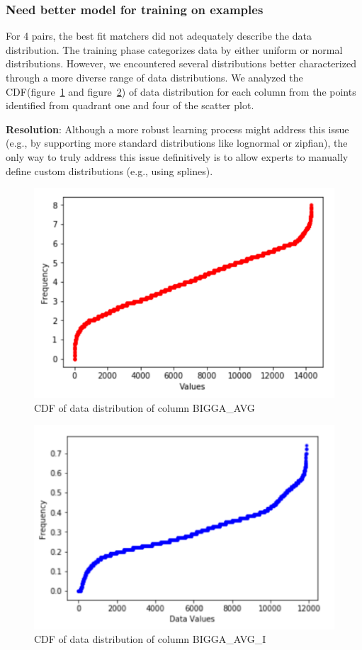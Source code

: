 \subsubsection{Need better model for training on examples}
For 4 pairs, the best fit matchers did not adequately describe the data distribution.
The training phase categorizes data by either uniform or normal distributions. 
However, we encountered several distributions better characterized through a more diverse range of data distributions.
We analyzed the CDF(figure~\ref{fig:Distribution 1} and figure~\ref{fig:Distribution 2}) of data distribution for each column from the points identified from quadrant one and four of the scatter plot. 

\textbf{Resolution}: Although a more robust learning process might address this issue (e.g., by supporting more standard distributions like lognormal or zipfian), the only way to truly address this issue definitively is to allow experts to manually define custom distributions (e.g., using splines).

\begin{figure}[H]
	\centering
	\includegraphics[width=0.8\columnwidth]{graphics/Challenge1_1}
	\caption{CDF of data distribution of column BIGGA\_AVG}
	\label{fig:Distribution 1}
\end{figure}

\begin{figure}[H]
	\centering
	\includegraphics[width=0.8\columnwidth]{graphics/Challenge1_2}
	\caption{CDF of data distribution of column BIGGA\_AVG\_I}
	\label{fig:Distribution 2}
\end{figure}

